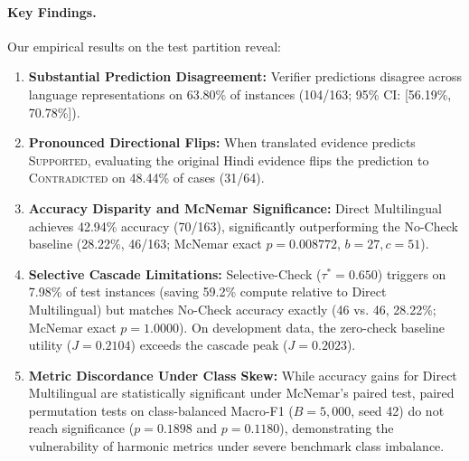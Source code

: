 \paragraph{Key Findings.}
Our empirical results on the test partition reveal:
\begin{enumerate}
    \item \textbf{Substantial Prediction Disagreement:} Verifier predictions disagree across language representations on 63.80\% of instances (104/163; 95\% CI: [56.19\%, 70.78\%]).
    \item \textbf{Pronounced Directional Flips:} When translated evidence predicts \textsc{Supported}, evaluating the original Hindi evidence flips the prediction to \textsc{Contradicted} on 48.44\% of cases (31/64).
    \item \textbf{Accuracy Disparity and McNemar Significance:} Direct Multilingual achieves 42.94\% accuracy (70/163), significantly outperforming the No-Check baseline (28.22\%, 46/163; McNemar exact $p = 0.008772$, $b=27, c=51$).
    \item \textbf{Selective Cascade Limitations:} Selective-Check ($\tau^*=0.650$) triggers on 7.98\% of test instances (saving 59.2\% compute relative to Direct Multilingual) but matches No-Check accuracy exactly (46 vs. 46, 28.22\%; McNemar exact $p = 1.0000$). On development data, the zero-check baseline utility ($J=0.2104$) exceeds the cascade peak ($J=0.2023$).
    \item \textbf{Metric Discordance Under Class Skew:} While accuracy gains for Direct Multilingual are statistically significant under McNemar's paired test, paired permutation tests on class-balanced Macro-F1 ($B=5,000$, seed 42) do not reach significance ($p=0.1898$ and $p=0.1180$), demonstrating the vulnerability of harmonic metrics under severe benchmark class imbalance.
\end{enumerate}
